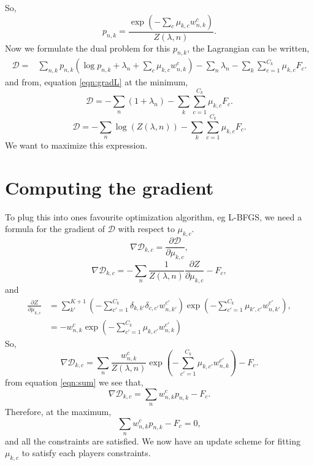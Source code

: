 \documentclass[12pt]{article}
\begin{document}
So,
\begin{equation}
p_{n,k}= \frac{\exp{\left(-\sum_{c}  \mu_{k,c}  w^{c}_{n,k}\right)}}{Z(\lambda, n)}.
\end{equation}
Now we formulate the dual problem for this $p_{n,k}$, the Lagrangian can be written,
\begin{align}
\mathcal{D}=&\sum_{n,k} p_{n,k} \left(\log{p_{n,k}}+\lambda_{n}+\sum_{c} \mu_{k,c}  w^{c}_{n,k}\right)-\sum_{n}\lambda_{n}-\sum_{k}\sum_{c=1}^{C_k} \mu_{k,c}F_{c}.
\end{align}
and from, equation \ref{eqn:gradL} at the minimum,
\begin{equation}
\mathcal{D}=-\sum_{n}(1+\lambda_{n})-\sum_{k}\sum_{c=1}^{C_k} \mu_{k,c}F_{c}.
\end{equation}
\begin{equation}
\mathcal{D}=-\sum_{n}\log{\left( Z(\lambda, n)\right)}-\sum_{k}\sum_{c=1}^{C_k} \mu_{k,c}F_{c}.
\end{equation}
We want to maximize this expression.
\section{Computing the gradient}
To plug this into ones favourite optimization algorithm, eg L-BFGS, we need a formula for the gradient of $\mathcal{D}$ with respect to $\mu_{k,c}$.
\begin{equation}
\nabla \mathcal{D}_{k,c}= 
\frac{\partial \mathcal{D}}{\partial \mu_{k,c}},
\end{equation}
\begin{equation}
\nabla \mathcal{D}_{k,c}= -\sum_{n}\frac{1}{ Z(\lambda, n)}\frac{\partial Z}{\partial \mu_{k,c}}-F_{c},
\end{equation}
and
\begin{align}
\frac{\partial Z}{\partial \mu_{k,c}}&=\sum_{k'}^{K+1}\left(-\sum_{c'=1}^{C_k} \delta_{k,k'}\delta_{c,c'}  w^{c'}_{n,k'}\right)\exp{\left(-\sum_{c'=1}^{C_k} \mu_{k',c'}  w^{c'}_{n,k'}\right)},\\
&=-w^{c}_{n,k}\exp{\left(-\sum_{c'=1}^{C_k} \mu_{k,c'}  w^{c'}_{n,k}\right)}
\end{align}
So,
\begin{equation}
\nabla \mathcal{D}_{k,c}= \sum_{n}\frac{w^{c}_{n,k}}{ Z(\lambda, n)}\exp{\left(-\sum_{c'=1}^{C_k} \mu_{k,c'}  w^{c'}_{n,k}\right)}-F_{c}.
\end{equation}
from equation \ref{eqn:sum} we see that,
\begin{equation}
\nabla \mathcal{D}_{k,c}= \sum_{n}w^{c}_{n,k}p_{n,k}-F_{c}.
\end{equation}
Therefore, at the maximum,
\begin{equation}
\sum_{n}w^{c}_{n,k}p_{n,k}-F_{c}=0,
\end{equation}
and all the constraints are satisfied. 
We now have an update scheme for fitting $\mu_{k,c}$ to satisfy each players constraints.
\end{document}
